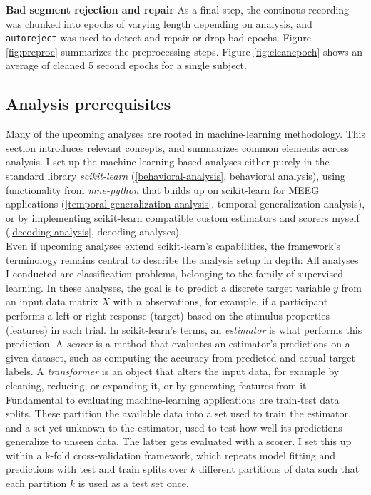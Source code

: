 \textbf{Bad segment rejection and repair} As a final step, the continous recording was chunked into epochs of varying length depending on analysis, and \texttt{autoreject} was used to detect and repair or drop bad epochs.
Figure \ref{fig:preproc} summarizes the preprocessing steps.
Figure \ref{fig:cleanepoch} shows an average of cleaned 5 second epochs for a single subject.



\subsection{Analysis prerequisites}
\label{decoding}

Many of the upcoming analyses are rooted in machine-learning methodology.
This section introduces relevant concepts, and summarizes common elements across analysis.
I set up the machine-learning based analyses either purely in the standard library \textit{scikit-learn} (\ref{behavioral-analysis}, behavioral analysis), using functionality from \textit{mne-python} that builds up on scikit-learn for MEEG applications (\ref{temporal-generalization-analysis}, temporal generalization analysis), or by implementing scikit-learn compatible custom estimators and scorers myself (\ref{decoding-analysis}, decoding analyses).\\
Even if upcoming analyses extend scikit-learn's capabilities, the framework's terminology remains central to describe the analysis setup in depth:
All analyses I conducted are classification problems, belonging to the family of supervised learning.
In these analyses, the goal is to predict a discrete target variable $y$ from an input data matrix $X$ with $n$ observations, for example, if a participant performs a left or right response (target) based on the stimulus properties (features) in each trial.
In scikit-learn's terms, an \textit{estimator} is what performs this prediction.
A \textit{scorer} is a method that evaluates an estimator's predictions on a given dataset, such as computing the accuracy from predicted and actual target labels.
A \textit{transformer} is an object that alters the input data, for example by cleaning, reducing, or expanding it, or by generating features from it.
Fundamental to evaluating machine-learning applications are train-test data splits.
These partition the available data into a set used to train the estimator, and a set yet unknown to the estimator, used to test how well its predictions generalize to unseen data.
The latter gets evaluated with a scorer.
I set this up within a k-fold cross-validation framework, which repeats model fitting and predictions with test and train splits over $k$ different partitions of data such that each partition $k$ is used as a test set once.
